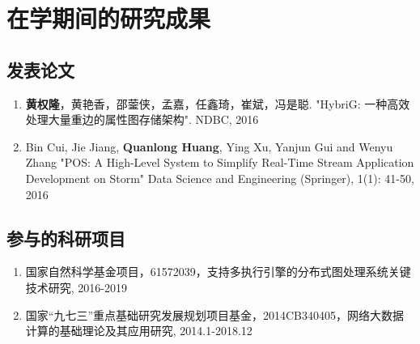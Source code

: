 
\chapter{在学期间的研究成果}

\section*{发表论文}
\begin{enumerate}
    \item \textbf{黄权隆}，黄艳香，邵蓥侠，孟嘉，任鑫琦，崔斌，冯是聪. "HybriG: 一种高效处理大量重边的属性图存储架构". NDBC, 2016
    \item Bin Cui, Jie Jiang, \textbf{Quanlong Huang}, Ying Xu, Yanjun Gui and Wenyu Zhang
"POS: A High-Level System to Simplify Real-Time Stream Application Development on Storm"
Data Science and Engineering (Springer),  1(1): 41-50, 2016
\end{enumerate}

\section*{参与的科研项目}

\begin{enumerate}
  \item 国家自然科学基金项目，61572039，支持多执行引擎的分布式图处理系统关键技术研究, 2016-2019
  \item 国家“九七三”重点基础研究发展规划项目基金，2014CB340405，网络大数据计算的基础理论及其应用研究, 2014.1-2018.12
\end{enumerate}

